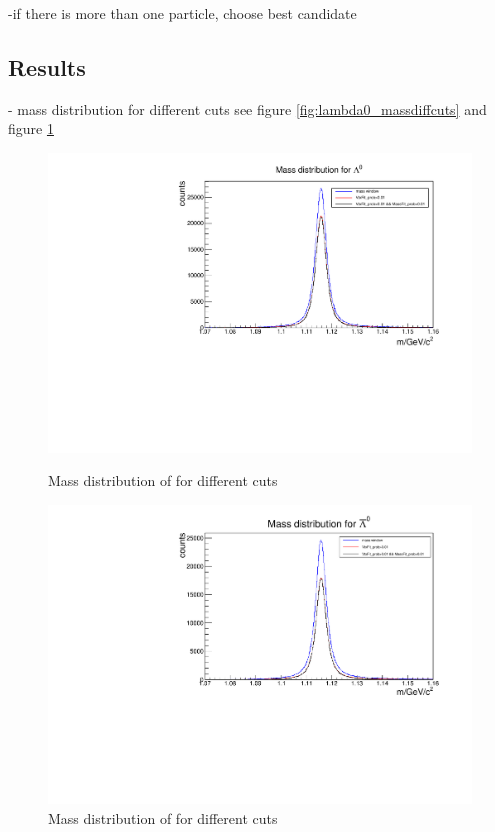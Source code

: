 		-if there is more than one particle, choose best candidate
		
		
	\subsection*{Results}
	
		- mass distribution for different cuts see figure \ref{fig:lambda0_massdiffcuts} and figure \ref{fig:antilambda0_massdiffcuts}
		
		\begin{figure}
			\centering
				\includegraphics[width=1.1\textwidth]{./plots/lambda0/lambda0_m_diffcuts.pdf}
			\caption{Mass distribution of \lam for different cuts}
			\label{fig:lambda0_massdiffcuts}
			
				\includegraphics[width=1.1\textwidth]{./plots/antilambda0/antiLambda0_m_diffcuts.pdf}
			\caption{Mass distribution of \alam for different cuts}
			\label{fig:antilambda0_massdiffcuts}
		\end{figure}
		
